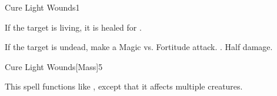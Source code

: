 \begin{spellsection}{Cure Light Wounds}{1}
    \begin{spellheader}
    \end{spellheader}
    \begin{spellcontent}
        \begin{spelltargetinginfo}
        \end{spelltargetinginfo}
        \begin{spelleffects}
            \spelleffect If the target is living, it is healed for .
            \begin{spellattacktriggered}{If the target is undead, make a Magic vs. Fortitude attack.}
                \spellsuccess {}.
                \spellfailure Half damage.
            \end{spellattacktriggered}
        \end{spelleffects}
    \end{spellcontent}
    \begin{spellfooter}
        \miscastrandom
    \end{spellfooter}
\end{spellsection}

\begin{spellsection}{Cure Light Wounds}[Mass]{5}
    \begin{spellheader}
    \end{spellheader}
    \begin{spellcontent}
        \begin{spelltargetinginfo}
        \end{spelltargetinginfo}
        \begin{spelleffects}
            \spellspecial This spell functions like , except that it affects multiple creatures.
        \end{spelleffects}
    \end{spellcontent}
    \begin{spellfooter}
        \miscastexplode
    \end{spellfooter}
\end{spellsection}

